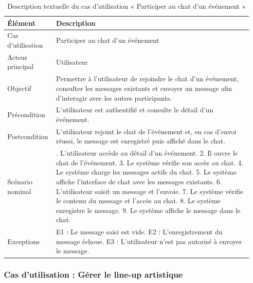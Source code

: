\begin{table}[H]
\centering
\caption{Description textuelle du cas d’utilisation « Participer au chat d’un événement »}
\label{tableau:5-3}
\renewcommand{\arraystretch}{1.2}
\begin{tabularx}{\textwidth}{|>{\raggedright\arraybackslash}X|>{\raggedright\arraybackslash}X|}
\hline
\rowcolor[HTML]{ECF4FF}
\textbf{Élément} & \textbf{Description} \\
\hline
Cas d’utilisation & Participer au chat d’un événement \\
\hline
Acteur principal & Utilisateur \\
\hline
Objectif & Permettre à l’utilisateur de rejoindre le chat d’un événement, consulter les messages existants et envoyer un message afin d’interagir avec les autres participants. \\
\hline
Précondition & L’utilisateur est authentifié et consulte le détail d’un événement. \\
\hline
Postcondition & L’utilisateur rejoint le chat de l’événement et, en cas d’envoi réussi, le message est enregistré puis affiché dans le chat. \\
\hline
Scénario nominal & 1. L’utilisateur accède au détail d’un événement.\newline{} 2. Il ouvre le chat de l’événement.\newline{} 3. Le système vérifie son accès au chat.\newline{} 4. Le système charge les messages actifs du chat.\newline{} 5. Le système affiche l’interface de chat avec les messages existants.\newline{} 6. L’utilisateur saisit un message et l’envoie.\newline{} 7. Le système vérifie le contenu du message et l’accès au chat.\newline{} 8. Le système enregistre le message.\newline{} 9. Le système affiche le message dans le chat. \\
\hline
Exceptions & E1 : Le message saisi est vide.\newline{} E2 : L’enregistrement du message échoue.\newline{} E3 : L’utilisateur n’est pas autorisé à envoyer le message. \\
\hline
\end{tabularx}
\end{table}


\subsubsection{Cas d’utilisation : Gérer le line-up artistique}


